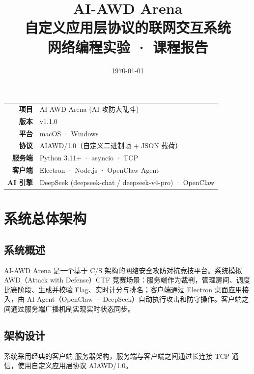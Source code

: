 \documentclass[12pt,a4paper]{ctexbook}
\title{\Huge \textbf{AI-AWD Arena}\\[6pt]
       \Large 自定义应用层协议的联网交互系统\\[12pt]
       \normalsize 网络编程实验 · 课程报告}
\author{}
\date{\today}
\begin{document}
\maketitle
\thispagestyle{empty}

\vspace{20pt}
\begin{center}
\begin{tabular}{rl}
\textbf{项目} & AI-AWD Arena (AI 攻防大乱斗) \\
\textbf{版本} & v1.1.0 \\
\textbf{平台} & macOS · Windows \\
\textbf{协议} & AIAWD/1.0（自定义二进制帧 + JSON 载荷） \\
\textbf{服务端} & Python 3.11+ · asyncio · TCP \\
\textbf{客户端} & Electron · Node.js · OpenClaw Agent \\
\textbf{AI 引擎} & DeepSeek (deepseek-chat / deepseek-v4-pro) · OpenClaw \\
\end{tabular}
\end{center}

\newpage
\tableofcontents
\newpage

\chapter{系统总体架构}

\section{系统概述}

AI-AWD Arena 是一个基于 C/S 架构的网络安全攻防对抗竞技平台。系统模拟 AWD（Attack with Defense）CTF 竞赛场景：服务端作为裁判，管理房间、调度比赛阶段、生成并校验 Flag、实时计分与排名；客户端通过 Electron 桌面应用接入，由 AI Agent（OpenClaw + DeepSeek）自动执行攻击和防守操作。客户端之间通过服务端广播机制实现实时状态同步。

\section{架构设计}

系统采用经典的客户端-服务器架构，服务端与客户端之间通过长连接 TCP 通信，使用自定义应用层协议 AIAWD/1.0。
\end{document}
